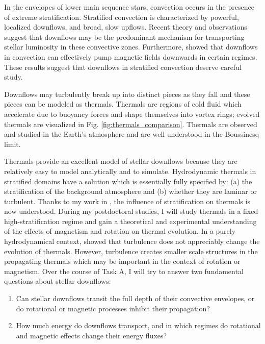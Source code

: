 \documentclass[11pt, preprint]{aastex}
\begin{document}
In the envelopes of lower main sequence stars, convection occurs in the presence of extreme stratification.
Stratified convection is characterized by powerful, localized downflows, and broad, slow upflows.
Recent theory and observations \citep[e.g.,][]{hanasoge&all2015, brandenburg2016, kapyla&all2017, andersLB2019} suggest that downflows may be the predominant mechanism for transporting stellar luminosity in these convective zones.
Furthermore, \citet{tobias&all1998} showed that downflows in convection can effectively pump magnetic fields downwards in certain regimes.
These results suggest that downflows in stratified convection deserve careful study.

Downflows may turbulently break up into distinct pieces as they fall and these pieces can be modeled as thermals.
Thermals are regions of cold fluid which accelerate due to buoyancy forces and shape themselves into vortex rings; evolved thermals are visualized in Fig. \ref{fig:thermals_comparison}.
Thermals are observed and studied in the Earth's atmosphere and are well understood in the Boussinesq limit.

Thermals provide an excellent model of stellar downflows because they are relatively easy to model analytically and to simulate.
Hydrodynamic thermals in stratified domains have a solution which is essentially fully specified by: (a) the stratification of the background atmosphere and (b) whether they are laminar or turbulent.
Thanks to my work in \citet{andersLB2019}, the influence of stratification on thermals is now understood.
During my postdoctoral studies, I will study thermals in a fixed high-stratification regime and gain a theoretical and experimental understanding of the effects of magnetism and rotation on thermal evolution.
In a purely hydrodynamical context, \citet{lecoanet&jeevanjee2019} showed that turbulence does not appreciably change the evolution of thermals.
However, turbulence creates smaller scale structures in the propagating thermals which may be important in the context of rotation or magnetism.
Over the course of Task A, I will try to answer two fundamental questions about stellar downflows:
\vspace{-16pt}
\begin{enumerate}
\item Can stellar downflows transit the full depth of their convective envelopes, or do rotational or magnetic processes inhibit their propagation?
\vspace{-10pt}
\item How much energy do downflows transport, and in which regimes do rotational and magnetic effects change their energy fluxes?
\vspace{-10pt}
\end{enumerate}
\end{document}
